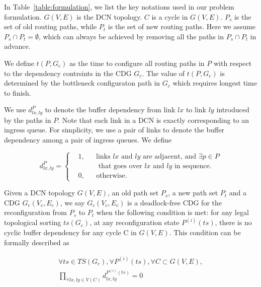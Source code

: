 In Table~\ref{table:formulation}, we list the key notations used in our problem formulation. $G(V,E)$ is the DCN topology. $C$ is a cycle in $G(V,E)$.  $P_s$ is the set of old routing paths, while $P_t$ is the set of new routing paths. Here we assume $P_s \cap P_t = \emptyset$, which can always be achieved by removing all the paths in $P_s \cap P_t$ in advance.



We define $t(P, G_c)$ as the time to configure all routing paths in $P$ with respect to the dependency contrsints in the CDG $G_c$. The value of $t(P, G_c)$ is determined by the bottleneck configuraton path in $G_c$ which requires longest time to finish.

We use $d_{lx,ly}^P$ to denote the buffer dependency from link $lx$ to link $ly$ introduced by the paths in $P$. Note that each link in a DCN is exactly corresponding to an ingress queue. For simplicity, we use a pair of links to denote the buffer dependency among a pair of ingress queues.  We define

\begin{equation} \label{eq:1}
d_{lx,ly}^P = \left \{
\begin{aligned}
&1, && \text{links } lx \text{ and } ly\text{ are adjacent, and } \exists p \in P\\
&    &&  \text{ that goes over } lx \text{ and } ly\text{ in sequence.}\\ 
&0, && \text{otherwise.}
\end{aligned} \right.
\end{equation} 



Given a DCN topology $G(V,E)$, an old path set $P_s$, a new path set $P_t$ and a CDG $G_c(V_c,E_c)$,  we say $G_c(V_c,E_c)$ is a deadlock-free CDG for the  reconfiguration from $P_s$ to $P_t$ when the following condition is met: for any legal topological sorting $ts(G_c)$, at any reconfiguration state ${P^{(i)}(ts)}$, there is no cyclic buffer dependency for any cycle C in $G(V,E)$. This condition can be formally described as

\begin{equation}  \label{eq:2}
\begin{split}
 \forall ts \in TS(G_c), \forall P^{(i)}(ts), \forall C \subset G(V,E), \\
 \displaystyle{\prod\limits_{\forall lx, ly \in V(C)} d_{lx,ly}^{P^{(i)}(ts)} =0}
 \end{split}
\end{equation} 

